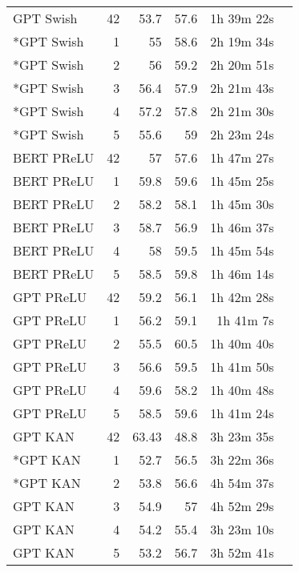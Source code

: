 \begin{table}[!htp]
\begin{tabular}{lrrrrr}
    GPT Swish &42 &53.7 &57.6 &1h 39m 22s \\
    *GPT Swish &1 &55 &58.6 &2h 19m 34s \\
    *GPT Swish &2 &56 &59.2 &2h 20m 51s \\
    *GPT Swish &3 &56.4 &57.9 &2h 21m 43s \\
    *GPT Swish &4 &57.2 &57.8 &2h 21m 30s \\
    *GPT Swish &5 &55.6 &59 &2h 23m 24s \\
    BERT PReLU &42 &57 &57.6 &1h 47m 27s \\
    BERT PReLU &1 &59.8 &59.6 &1h 45m 25s \\
    BERT PReLU &2 &58.2 &58.1 &1h 45m 30s \\
    BERT PReLU &3 &58.7 &56.9 &1h 46m 37s \\
    BERT PReLU &4 &58 &59.5 &1h 45m 54s \\
    BERT PReLU &5 &58.5 &59.8 &1h 46m 14s \\
    GPT PReLU &42 &59.2 &56.1 &1h 42m 28s \\
    GPT PReLU &1 &56.2 &59.1 &1h 41m 7s \\
    GPT PReLU &2 &55.5 &60.5 &1h 40m 40s \\
    GPT PReLU &3 &56.6 &59.5 &1h 41m 50s \\
    GPT PReLU &4 &59.6 &58.2 &1h 40m 48s \\
    GPT PReLU &5 &58.5 &59.6 &1h 41m 24s \\
    GPT KAN &42 &63.43 &48.8 &3h 23m 35s \\
    *GPT KAN &1 &52.7 &56.5 &3h 22m 36s \\
    *GPT KAN &2 &53.8 &56.6 &4h 54m 37s \\
    GPT KAN &3 &54.9 &57 &4h 52m 29s \\
    GPT KAN &4 &54.2 &55.4 &3h 23m 10s \\
    GPT KAN &5 &53.2 &56.7 &3h 52m 41s \\
    \bottomrule
    \end{tabular}
    \end{table}

